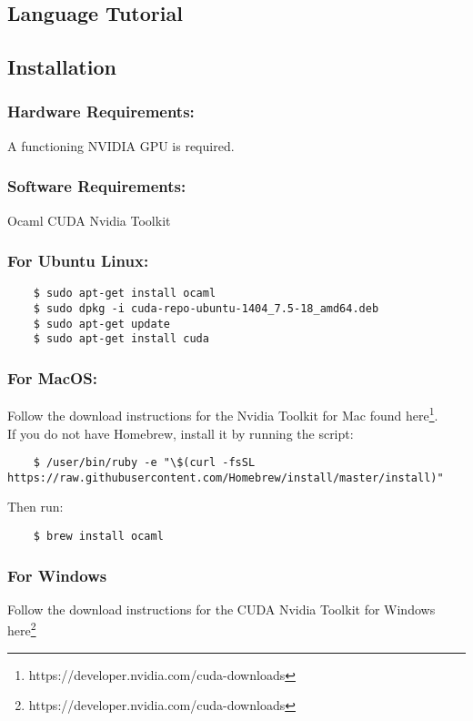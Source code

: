 \begin{homeworkProblem}
	\chapter{Language Tutorial}
	\section{Installation}
	\subsection{Hardware Requirements:}
	A functioning NVIDIA GPU is required.
	\subsection{Software Requirements:}
	Ocaml CUDA Nvidia Toolkit
	\subsection{For Ubuntu Linux:}
	\begin{verbatim}
    $ sudo apt-get install ocaml
    $ sudo dpkg -i cuda-repo-ubuntu-1404_7.5-18_amd64.deb
    $ sudo apt-get update
    $ sudo apt-get install cuda
	\end{verbatim}
	
	\subsection{For MacOS:}
    Follow the download instructions for the Nvidia Toolkit for Mac found here\footnote{https://developer.nvidia.com/cuda-downloads}.\\
    If you do not have Homebrew, install it by running the script:
    \begin{verbatim}
    $ /user/bin/ruby -e "\$(curl -fsSL https://raw.githubusercontent.com/Homebrew/install/master/install)"
	\end{verbatim}
	
	Then run:
	\begin{verbatim}
    $ brew install ocaml
	\end{verbatim}

    \subsection{For Windows}
    Follow the download instructions for the CUDA Nvidia Toolkit for Windows here\footnote{https://developer.nvidia.com/cuda-downloads}\\
    

\end{homeworkProblem}
